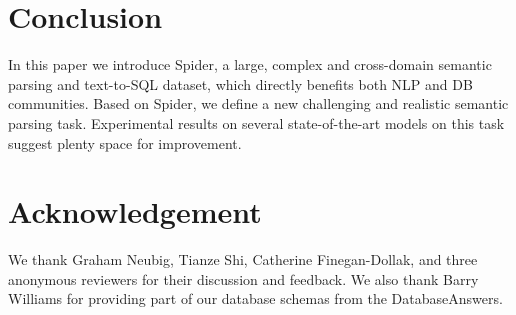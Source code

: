 \documentclass[11pt,a4paper]{article}
\begin{document}
\section{Conclusion}
\label{sec:conclusion}

In this paper we introduce Spider, a large, complex and cross-domain semantic parsing and text-to-SQL dataset,
which directly benefits both NLP and DB communities.
Based on Spider, we define a new challenging and realistic semantic parsing task.
Experimental results on several state-of-the-art models on this task suggest plenty space for improvement.


\section*{Acknowledgement}
We thank Graham Neubig, Tianze Shi, Catherine Finegan-Dollak, and three anonymous reviewers for their discussion and feedback.
We also thank Barry Williams for providing part of our database schemas from the DatabaseAnswers.



\end{document}
